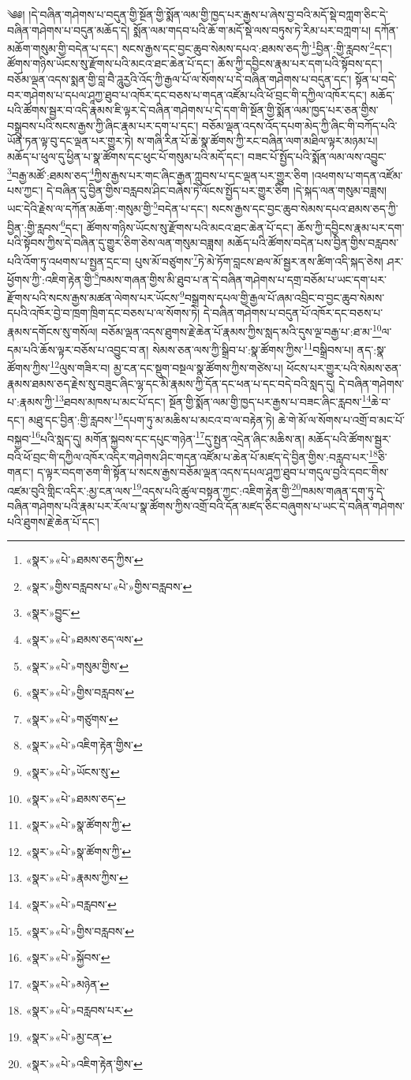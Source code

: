 ༄༅། །དེ་བཞིན་གཤེགས་པ་བདུན་གྱི་སྔོན་གྱི་སྨོན་ལམ་གྱི་ཁྱད་པར་རྒྱས་པ་ཞེས་བྱ་བའི་མདོ་སྡེ་བཀླག་ཅིང་དེ་བཞིན་གཤེགས་པ་བདུན་མཆོད་དེ། སྨོན་ལམ་གདབ་པའི་ཆོ་ག་མདོ་སྡེ་ལས་བཏུས་ཏེ་རིམ་པར་བཀླག་པ། དཀོན་མཆོག་གསུམ་གྱི་བདེན་པ་དང་། སངས་རྒྱས་དང་བྱང་ཆུབ་སེམས་དཔའ་:ཐམས་ཅད་ཀྱི་\footnote{«སྣར་»«པེ་»ཐམས་ཅད་ཀྱིས་}བྱིན་:གྱི་རླབས་\footnote{«སྣར་»གྱིས་བརླབས་པ་«པེ་»གྱིས་བརླབས་}དང་། ཚོགས་གཉིས་ཡོངས་སུ་རྫོགས་པའི་མངའ་ཐང་ཆེན་པོ་དང་། ཆོས་ཀྱི་དབྱིངས་རྣམ་པར་དག་པའི་སྟོབས་དང་། བཅོམ་ལྡན་འདས་སྨན་གྱི་བླ་བཻ་ཌཱུརྱའི་འོད་ཀྱི་རྒྱལ་པོ་ལ་སོགས་པ་དེ་བཞིན་གཤེགས་པ་བདུན་དང་། སྟོན་པ་བདེ་བར་གཤེགས་པ་དཔལ་ཤཱཀྱ་ཐུབ་པ་འཁོར་དང་བཅས་པ་གདན་འཛོམ་པའི་ཕོ་བྲང་གི་དཀྱིལ་འཁོར་དང་། མཆོད་པའི་ཚོགས་སྦྱར་བ་འདི་རྣམས་ཇི་ལྟར་དེ་བཞིན་གཤེགས་པ་དེ་དག་གི་སྔོན་གྱི་སྨོན་ལམ་ཁྱད་པར་ཅན་གྱིས་བསྒྲུབས་པའི་སངས་རྒྱས་ཀྱི་ཞིང་རྣམ་པར་དག་པ་དང་། བཅོམ་ལྡན་འདས་འོད་དཔག་མེད་ཀྱི་ཞིང་གི་བཀོད་པའི་ཡོན་ཏན་ལྟ་བུ་དང་ལྡན་པར་གྱུར་ཏེ། ས་གཞི་རིན་པོ་ཆེ་སྣ་ཚོགས་ཀྱི་རང་བཞིན་ལག་མཐིལ་ལྟར་མཉམ་པ། མཆོད་པ་ཕུལ་དུ་ཕྱིན་པ་སྣ་ཚོགས་དང་ཕུང་པོ་གསུམ་པའི་མདོ་དང་། བཟང་པོ་སྤྱོད་པའི་སྨོན་ལམ་ལས་འབྱུང་\footnote{«སྣར་»བྱུང་}བརྒྱ་མཚོ་:ཐམས་ཅད་\footnote{«སྣར་»«པེ་»ཐམས་ཅད་ལས་}ཀྱིས་རྒྱས་པར་གང་ཞིང་རྒྱན་ཀླུབས་པ་དང་ལྡན་པར་གྱུར་ཅིག །འཕགས་པ་གདན་འཛོམ་པས་ཀྱང་། དེ་བཞིན་དུ་བྱིན་གྱིས་བརླབས་ཤིང་བཞེས་ཏེ་ལོངས་སྤྱོད་པར་གྱུར་ཅིག །དེ་སྐད་ལན་གསུམ་བཟླས། ཡང་དེའི་རྗེས་ལ་དཀོན་མཆོག་:གསུམ་གྱི་\footnote{«སྣར་»«པེ་»གསུམ་གྱིས་}བདེན་པ་དང་། སངས་རྒྱས་དང་བྱང་ཆུབ་སེམས་དཔའ་ཐམས་ཅད་ཀྱི་བྱིན་:གྱི་རླབས་\footnote{«སྣར་»«པེ་»གྱིས་བརླབས་}དང་། ཚོགས་གཉིས་ཡོངས་སུ་རྫོགས་པའི་མངའ་ཐང་ཆེན་པོ་དང་། ཆོས་ཀྱི་དབྱིངས་རྣམ་པར་དག་པའི་སྟོབས་ཀྱིས་དེ་བཞིན་དུ་གྱུར་ཅིག་ཅེས་ལན་གསུམ་བཟླས། མཆོད་པའི་ཚོགས་བདེན་པས་བྱིན་གྱིས་བརླབས་པའི་འོག་ཏུ་འཕགས་པ་སྤྱན་དྲང་བ། པུས་མོ་བཙུགས་\footnote{«སྣར་»«པེ་»གཙུགས་}ཏེ་མེ་ཏོག་བླངས་ཐལ་མོ་སྦྱར་ནས་ཚིག་འདི་སྐད་ཅེས། ཤར་ཕྱོགས་ཀྱི་:འཇིག་རྟེན་གྱི་\footnote{«སྣར་»«པེ་»འཇིག་རྟེན་གྱིས་}ཁམས་གཞན་གྱིས་མི་ཐུབ་པ་ན་དེ་བཞིན་གཤེགས་པ་དགྲ་བཅོམ་པ་ཡང་དག་པར་རྫོགས་པའི་སངས་རྒྱས་མཚན་ལེགས་པར་ཡོངས་\footnote{«སྣར་»«པེ་»ཡོངས་སུ་}བསྒྲགས་དཔལ་གྱི་རྒྱལ་པོ་ཞམ་འབྲིང་བ་བྱང་ཆུབ་སེམས་དཔའི་འཁོར་བྱེ་བ་ཁྲག་ཁྲིག་དང་བཅས་པ་ལ་སོགས་ཏེ། དེ་བཞིན་གཤེགས་པ་བདུན་པོ་འཁོར་དང་བཅས་པ་རྣམས་དགོངས་སུ་གསོལ། བཅོམ་ལྡན་འདས་ཐུགས་རྗེ་ཆེན་པོ་རྣམས་ཀྱིས་སླད་མའི་དུས་ལྔ་བརྒྱ་པ་:ཐ་མ་\footnote{«སྣར་»«པེ་»ཐམས་ཅད་}ལ་དམ་པའི་ཆོས་ལྟར་བཅོས་པ་འབྱུང་བ་ན། སེམས་ཅན་ལས་ཀྱི་སྒྲིབ་པ་:སྣ་ཚོགས་ཀྱིས་\footnote{«སྣར་»«པེ་»སྣ་ཚོགས་ཀྱི་}བསྒྲིབས་པ། ནད་:སྣ་ཚོགས་ཀྱིས་\footnote{«སྣར་»«པེ་»སྣ་ཚོགས་ཀྱི་}ལུས་གཟིར་བ། མྱ་ངན་དང་སྡུག་བསྔལ་སྣ་ཚོགས་ཀྱིས་གཙེས་པ། ཕོངས་པར་གྱུར་པའི་སེམས་ཅན་རྣམས་ཐམས་ཅད་རྗེས་སུ་བཟུང་ཞིང་ལྷ་དང་མི་རྣམས་ཀྱི་དོན་དང་ཕན་པ་དང་བདེ་བའི་སླད་དུ། དེ་བཞིན་གཤེགས་པ་:རྣམས་ཀྱི་\footnote{«སྣར་»«པེ་»རྣམས་ཀྱིས་}ཐབས་མཁས་པ་མང་པོ་དང་། སྔོན་གྱི་སྨོན་ལམ་གྱི་ཁྱད་པར་རྒྱས་པ་བཟང་ཞིང་རླབས་\footnote{«སྣར་»«པེ་»བརླབས་}ཆེ་བ་དང་། མཐུ་དང་བྱིན་:གྱི་རླབས་\footnote{«སྣར་»«པེ་»གྱིས་བརླབས་}དཔག་ཏུ་མ་མཆིས་པ་མངའ་བ་ལ་བརྟེན་ཏེ། ཆེ་གེ་མོ་ལ་སོགས་པ་འགྲོ་བ་མང་པོ་བསྐྱབ་\footnote{«སྣར་»«པེ་»སྐྱོབས་}པའི་སླད་དུ། མགོན་སྐྱབས་དང་དཔུང་གཉེན་\footnote{«སྣར་»«པེ་»མཉེན་}དུ་སྤྱན་འདྲེན་ཞིང་མཆིས་ན། མཆོད་པའི་ཚོགས་སྦྱར་བའི་ཕོ་བྲང་གི་དཀྱིལ་འཁོར་འདིར་གཤེགས་ཤིང་གདན་འཛོམ་པ་ཆེན་པོ་མཛད་དེ་བྱིན་གྱིས་:བརླབ་པར་\footnote{«སྣར་»«པེ་»བརླབས་པར་}ཅི་གནང་། ད་ལྟར་བདག་ཅག་གི་སྟོན་པ་སངས་རྒྱས་བཅོམ་ལྡན་འདས་དཔལ་ཤཱཀྱ་ཐུབ་པ་གདུལ་བྱའི་དབང་གིས་འཛམ་བུའི་གླིང་འདིར་:མྱ་ངན་ལས་\footnote{«སྣར་»«པེ་»མྱ་ངན་}འདས་པའི་ཚུལ་བསྟན་ཀྱང་:འཇིག་རྟེན་གྱི་\footnote{«སྣར་»«པེ་»འཇིག་རྟེན་གྱིས་}ཁམས་གཞན་དག་ཏུ་དེ་བཞིན་གཤེགས་པའི་རྣམ་པར་རོལ་པ་སྣ་ཚོགས་ཀྱིས་འགྲོ་བའི་དོན་མཛད་ཅིང་བཞུགས་པ་ཡང་དེ་བཞིན་གཤེགས་པའི་ཐུགས་རྗེ་ཆེན་པོ་དང་། 